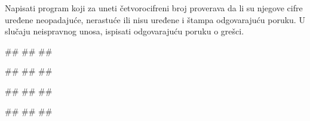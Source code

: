 \begin{Exercise}[label=KT_NG_16] 
Napisati program koji za uneti četvorocifreni broj proverava
da li su njegove cifre uređene neopadajuće, nerastuće ili nisu
uređene i štampa odgovarajuću poruku.  
U slučaju neispravnog unosa, ispisati odgovarajuću poruku o grešci.

\begin{miditest}
\begin{upotreba}{1}
#\naslovInt#
##
##
\end{upotreba}
\end{miditest}
\begin{miditest}
\begin{upotreba}{2}
#\naslovInt#
##
##\end{upotreba}
\end{miditest}

\begin{miditest}
\begin{upotreba}{3}
#\naslovInt#
##
##
\end{upotreba}
\end{miditest}
\begin{miditest}
\begin{upotreba}{4}
#\naslovInt#
##
##
\end{upotreba}
\end{miditest}

\end{Exercise}
\ifresenja
 \begin{Answer}[ref=KT_NG_16]
\end{Answer}
\fi




